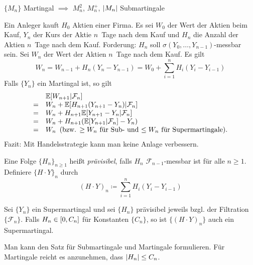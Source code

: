 \documentclass{cheat-sheet}
\newcommand{\E}{\mathbb{E}} %
\newcommand{\Filt}{\mathcal{F}} %
\begin{document}
\begin{bsp}
  $\{ M_n \}$ Martingal $\implies$ $M_n^2$, $M_n^{+}$, $\lvert M_n\rvert$ Submartingale
\end{bsp}

\begin{bsp}
  Ein Anleger kauft $H_0$ Aktien einer Firma.
  Es sei $W_0$ der Wert der Aktien beim Kauf,
  $Y_n$ der Kurs der Aktie $n$~Tage nach dem Kauf und
  $H_n$ die Anzahl der Aktien $n$~Tage nach dem Kauf.
  Forderung: $H_n$ soll $\sigma(Y_0, \ldots, Y_{n-1})$-messbar sein.
  Sei $W_n$ der Wert der Aktien $n$~Tage nach dem Kauf.
  Es gilt
  \[ W_n = W_{n-1} + H_n (Y_n - Y_{n-1}) = W_0 + {\sum}_{i=1}^n H_i (Y_i - Y_{i-1}) \]
  Falls $\{ Y_n \}$ ein Martingal ist, so gilt
  \[
    \begin{array}{c l}
      & \E[ W_{n+1} | \Filt_n ] \\
      = & W_n + \E[ H_{n+1} (Y_{n+1} - Y_n) | \Filt_n ] \\
      = & W_n + H_{n+1} \E[ Y_{n+1} - Y_n | \Filt_n ] \\
      = & W_n + H_{n+1} (\E[ Y_{n+1} | \Filt_n ] - Y_n) \\
      = & W_n \enspace (\text{bzw. $\geq W_n$ für Sub- und $\leq W_n$ für Supermartingale}).
    \end{array}
  \]
  Fazit: Mit Handelsstrategie kann man keine Anlage verbessern.
\end{bsp}

\begin{defn}
  Eine Folge $\{ H_n \}_{n \geq 1}$ heißt \emph{prävisibel}, falls $H_n$ $\Filt_{n-1}$-messbar ist für alle $n \geq 1$.
  Definiere $\{ H \cdot Y \}_n$ durch
  \[
    (H \cdot Y)_n \coloneqq {\sum}_{i=1}^n H_i (Y_i - Y_{i-1})
  \]
\end{defn}

\begin{satz}
  Sei $\{ Y_n \}$ ein Supermartingal und sei $\{ H_n \}$ prävisibel jeweils bzgl. der Filtration $\{ \Filt_n \}$.
  Falls $H_n \in \left[ 0, C_n \right]$ für Konstanten $\{ C_n \}$, so ist $\{ (H \cdot Y)_n \}$ auch ein Supermartingal.
\end{satz}

\begin{bem}
  Man kann den Satz für Submartingale und Martingale formulieren.
  Für Martingale reicht es anzunehmen, dass $\lvert H_n\rvert \leq C_n$.
\end{bem}
\end{document}
